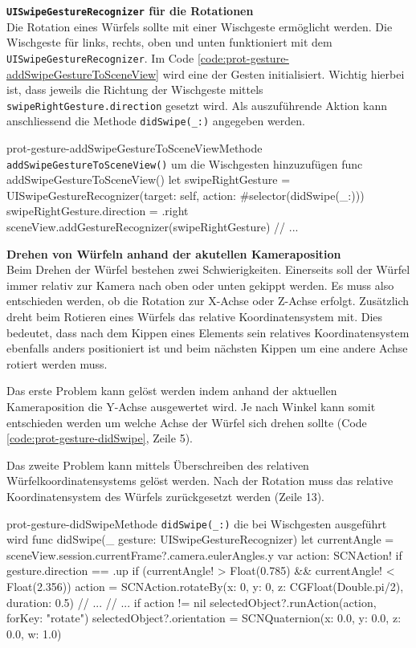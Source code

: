 \begin{description}
    \textbf{\texttt{UISwipeGestureRecognizer} für die Rotationen}\\
    Die Rotation eines Würfels sollte mit einer Wischgeste ermöglicht werden. Die Wischgeste für links, rechts, oben und unten funktioniert mit dem \texttt{UISwipeGestureRecognizer}. Im Code \ref{code:prot-gesture-addSwipeGestureToSceneView} wird eine der Gesten initialisiert. Wichtig hierbei ist, dass jeweils die Richtung der Wischgeste mittels \texttt{swipeRightGesture.direction} gesetzt wird. Als auszuführende Aktion kann anschliessend die Methode \texttt{didSwipe(\_:)} angegeben werden.

    \begin{code}{prot-gesture-addSwipeGestureToSceneView}{Methode \texttt{addSwipeGestureToSceneView()} um die Wischgesten hinzuzufügen}
        func addSwipeGestureToSceneView() {
            let swipeRightGesture = UISwipeGestureRecognizer(target: self, action: #selector(didSwipe(_:)))
            swipeRightGesture.direction = .right
            sceneView.addGestureRecognizer(swipeRightGesture)
            // ...
        }
    \end{code}

    \newpage
    \textbf{Drehen von Würfeln anhand der akutellen Kameraposition}\\
    Beim Drehen der Würfel bestehen zwei Schwierigkeiten. Einerseits soll der Würfel immer relativ zur Kamera nach oben oder unten gekippt werden. Es muss also entschieden werden, ob die Rotation zur X-Achse oder Z-Achse erfolgt. Zusätzlich dreht beim Rotieren eines Würfels das relative Koordinatensystem mit. Dies bedeutet, dass nach dem Kippen eines Elements sein relatives Koordinatensystem ebenfalls anders positioniert ist und beim nächsten Kippen um eine andere Achse rotiert werden muss. 

    Das erste Problem kann gelöst werden indem anhand der aktuellen Kameraposition die Y-Achse ausgewertet wird. Je nach Winkel kann somit entschieden werden um welche Achse der Würfel sich drehen sollte (Code \ref{code:prot-gesture-didSwipe}, Zeile 5).

    Das zweite Problem kann mittels Überschreiben des relativen Würfelkoordinatensystems gelöst werden. Nach der Rotation muss das relative Koordinatensystem des Würfels zurückgesetzt werden (Zeile 13).

    \begin{code}{prot-gesture-didSwipe}{Methode \texttt{didSwipe(\_:)} die bei Wischgesten ausgeführt wird}
    func didSwipe(_ gesture: UISwipeGestureRecognizer) {
        let currentAngle = sceneView.session.currentFrame?.camera.eulerAngles.y
        var action: SCNAction!
        if gesture.direction == .up {
            if (currentAngle! > Float(0.785) && currentAngle! < Float(2.356)) {
                action = SCNAction.rotateBy(x: 0, y: 0, z: CGFloat(Double.pi/2), duration: 0.5)
            }
            // ...
        }
        // ...
        if action != nil {
            selectedObject?.runAction(action, forKey: "rotate")
            selectedObject?.orientation = SCNQuaternion(x: 0.0, y: 0.0, z: 0.0, w: 1.0)
        }
    }
    \end{code} 

\end{description}    

